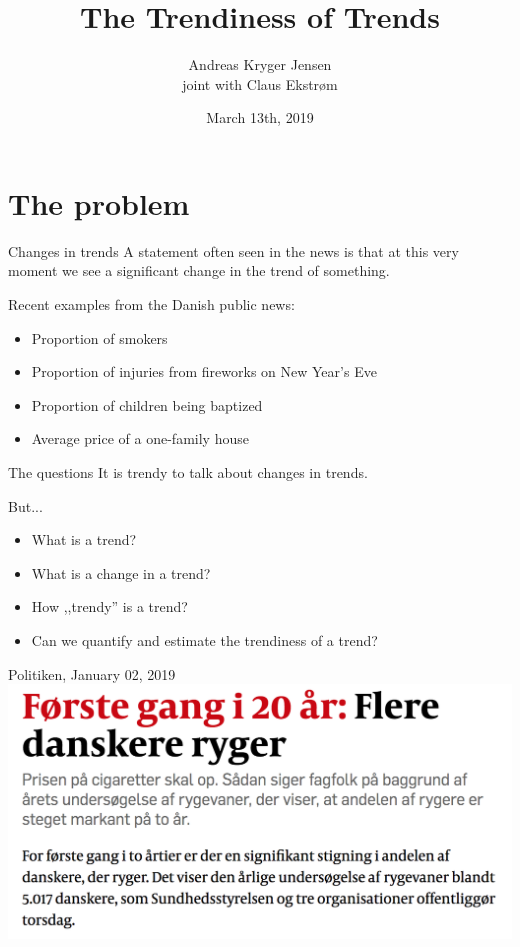 \documentclass[ignorenonframetext,xcolor=pdflatex,table,dvipsnames,serif]{beamer}
\title{The Trendiness of Trends}
\date{March 13th, 2019}
\author{Andreas Kryger Jensen\\ \scriptsize joint with Claus Ekstrøm}
\institute{Biostatistics, Institute of Public Health\\ University of Copenhagen}
\begin{document}
\frame[plain]{\titlepage}
 
 

\section{The problem}

\begin{frame}{Changes in trends}
A statement often seen in the news is that at \alert{this very moment} we see a significant change in the trend of something.

Recent examples from the Danish public news:
\begin{itemize}
  \item{Proportion of smokers}
  \item{Proportion of injuries from fireworks on New Year's Eve}
  \item{Proportion of children being baptized}
  \item{Average price of a one-family house}
\end{itemize}
\end{frame}


\begin{frame}{The questions}
It is \alert{trendy} to talk about changes in trends.

But...
\begin{itemize}
  \item{What is a trend?}
  \item{What is a change in a trend?}
  \item{How ,,trendy'' is a trend?}
  \item{Can we quantify and estimate the \alert{trendiness} of a trend?}
\end{itemize}

\end{frame}


\begin{frame}{Politiken, January 02, 2019}
\center\includegraphics[scale=0.5]{rygere.png}
\end{frame}
\end{document}
